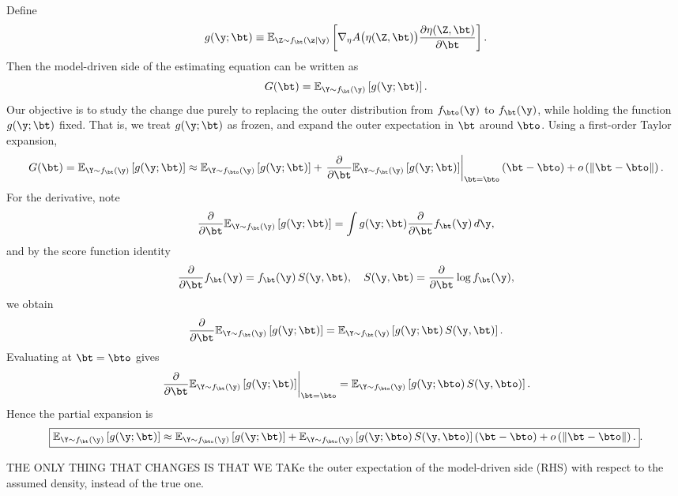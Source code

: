 \noindent
Define
\[
g(\y;\bt) 
\equiv 
\mathbb{E}_{\Z \sim f_\bt(\z \mid \y)}
\left[
    \nabla_\eta A\bigl(\eta(\Z,\bt)\bigr)
    \frac{\partial \eta(\Z,\bt)}{\partial \bt}
\right].
\]
Then the model-driven side of the estimating equation can be written as
\[
G(\bt) = \mathbb{E}_{\Y \sim f_\bt(\y)} \left[ g(\y;\bt) \right].
\]
Our objective is to study the change due purely to replacing the outer distribution from $f_{\bto}(\y)$ to $f_\bt(\y)$, while holding the function $g(\y;\bt)$ fixed. That is, we treat $g(\y;\bt)$ as frozen, and expand the outer expectation in $\bt$ around $\bto$. Using a first-order Taylor expansion,
\[
G(\bt)
=
\mathbb{E}_{\Y \sim f_\bt(\y)} \left[ g(\y;\bt) \right]
\approx
\mathbb{E}_{\Y \sim f_{\bto}(\y)} \left[ g(\y;\bt) \right]
+
\left.
\frac{\partial}{\partial \bt} 
\mathbb{E}_{\Y \sim f_\bt(\y)} \left[ g(\y;\bt) \right]
\right|_{\bt = \bto}
(\bt - \bto)
+
o\left( \|\bt - \bto\| \right).
\]
For the derivative, note
\[
\frac{\partial}{\partial \bt} 
\mathbb{E}_{\Y \sim f_\bt(\y)} \left[ g(\y;\bt) \right]
=
\int g(\y;\bt) \frac{\partial}{\partial \bt} f_\bt(\y)\, d\y,
\]
and by the score function identity
\[
\frac{\partial}{\partial \bt} f_\bt(\y)
=
f_\bt(\y) \, S(\y,\bt),
\quad
S(\y,\bt) = \frac{\partial}{\partial \bt} \log f_\bt(\y),
\]
we obtain
\[
\frac{\partial}{\partial \bt} 
\mathbb{E}_{\Y \sim f_\bt(\y)} \left[ g(\y;\bt) \right]
=
\mathbb{E}_{\Y \sim f_\bt(\y)} \left[
    g(\y;\bt) \, S(\y,\bt)
\right].
\]
Evaluating at $\bt = \bto$ gives
\[
\left.
\frac{\partial}{\partial \bt} 
\mathbb{E}_{\Y \sim f_\bt(\y)} \left[ g(\y;\bt) \right]
\right|_{\bt = \bto}
=
\mathbb{E}_{\Y \sim f_{\bto}(\y)} \left[
    g(\y;\bto) \, S(\y,\bto)
\right].
\]
Hence the partial expansion is
\[
\boxed{
\mathbb{E}_{\Y \sim f_\bt(\y)} \left[ g(\y;\bt) \right]
\approx
\mathbb{E}_{\Y \sim f_{\bto}(\y)} \left[ g(\y;\bt) \right]
+
\mathbb{E}_{\Y \sim f_{\bto}(\y)} \left[
    g(\y;\bto) \, S(\y,\bto)
\right]
(\bt - \bto)
+
o\left( \|\bt - \bto\| \right).
}.
\]






\newpage
THE ONLY THING THAT CHANGES IS THAT WE TAKe the outer expectation of the model-driven side (RHS) with respect to the assumed density, instead of the true one.



